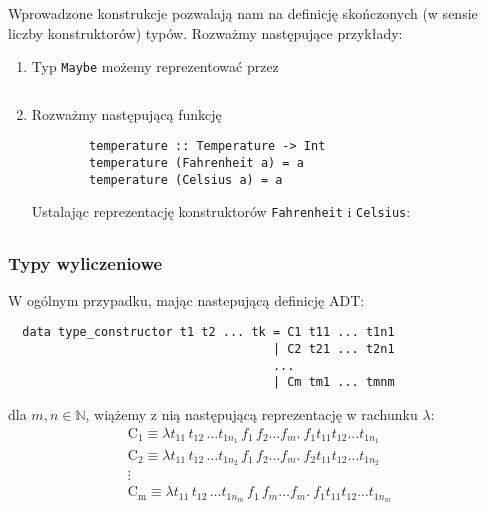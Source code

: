 \begin{przyklad}
  Wprowadzone konstrukcje pozwalają nam na definicję skończonych (w sensie liczby konstruktorów) typów. Rozważmy następujące przykłady:
  \begin{enumerate}[label=\alph*)]
    \setlength\itemsep{0em}
    \item Typ \texttt{Maybe} możemy reprezentować przez
      \begin{verbatim}
      \end{verbatim}
    \item Rozważmy następującą funkcję
      \begin{verbatim} 
        temperature :: Temperature -> Int
        temperature (Fahrenheit a) = a
        temperature (Celsius a) = a 
      \end{verbatim}
      Ustalając reprezentację konstruktorów \texttt{Fahrenheit} i \texttt{Celsius}:
      \begin{align*}
      \end{align*}
      
  \end{enumerate}

\end{przyklad}
\subsubsection{Typy wyliczeniowe}
W ogólnym przypadku, mając nastepującą definicję ADT:
\begin{verbatim}
  data type_constructor t1 t2 ... tk = C1 t11 ... t1n1
                                     | C2 t21 ... t2n1
                                     ...
                                     | Cm tm1 ... tmnm
\end{verbatim}
dla \(m, n \in \mathbb{N}\), wiążemy z nią następującą reprezentację w rachunku \(\lambda\):
\begin{gather*}
  \mathrm{C_1} \equiv \lambda t_{11}\, t_{12}\, \dots t_{1n_1}\, f_1\, f_2 \dots f_m.\ f_1 t_{11} t_{12} \dots t_{1n_1}\\
  \mathrm{C_2} \equiv \lambda t_{11}\, t_{12}\, \dots t_{1n_2}\, f_1\, f_2 \dots f_m.\ f_2 t_{11} t_{12} \dots t_{1n_2}\\
 \vdots\\
  \mathrm{C_m} \equiv \lambda t_{11}\, t_{12}\, \dots t_{1n_m}\, f_1\, f_m \dots f_m.\ f_1 t_{11} t_{12} \dots t_{1n_m}\\
\end{gather*}

